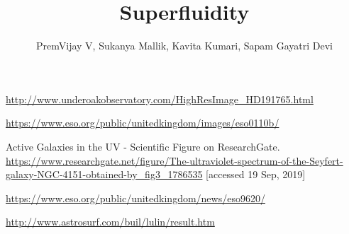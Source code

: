 \documentclass[11pt]{article}
\title{Superfluidity}
\author{ PremVijay V,
	 Sukanya Mallik,
	 Kavita Kumari,
	 Sapam Gayatri Devi
}
\begin{document}
\maketitle

\begin{thebibliography}{9}
	
	\url{http://www.underoakobservatory.com/HighResImage_HD191765.html}
	
	\url{https://www.eso.org/public/unitedkingdom/images/eso0110b/}
	
	Active Galaxies in the UV - Scientific Figure on ResearchGate. \url{https://www.researchgate.net/figure/The-ultraviolet-spectrum-of-the-Seyfert-galaxy-NGC-4151-obtained-by_fig3_1786535} [accessed 19 Sep, 2019]
	
	\url{https://www.eso.org/public/unitedkingdom/news/eso9620/}
	
	\url{http://www.astrosurf.com/buil/lulin/result.htm}
	
	
	
	
\end{thebibliography}
\end{document}
